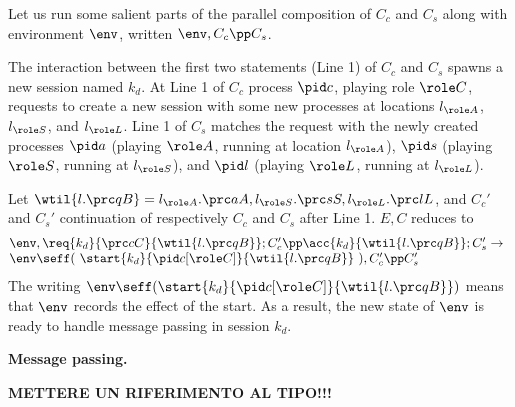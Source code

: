 Let us run some salient parts of the parallel composition of $C_c$ and $C_s$
along with environment $\env$, written $\env,C_c \pp C_s$.

The interaction between the first two statements (Line 1) of $C_c$ and $C_s$
spawns a new session named $k_d$. At Line 1 of $C_c$ process $\pid c$, playing
role $\role C$, requests to create a new session with some new processes at
locations $l_{\role A}$, $l_{\role S}$, and $l_{\role L}$. Line 1 of $C_s$
matches the request with the newly created processes $\pid a$ (playing $\role
A$, running at location $l_{\role A}$), $\pid s$ (playing $\role S$, running at
$l_{\role S}$), and $\pid l$ (playing $\role L$, running at $l_{\role L}$).

Let $\wtil{l.\prc qB} = l_{\role A}.\prc aA,l_{\role S}.\prc sS,l_{\role
L}.\prc lL$, and $C_c'$ and $C_s'$ continuation of respectively $C_c$ and $C_s$
after Line 1. $E,C$ reduces to
$$
\hspace{-.5em}\begin{array}{l}
\env,
\req{k_d}{\prc cC}{\wtil{l.\prc qB}}; C_c' 
	\pp
	\acc{k_d}{\wtil{l.\prc qB}}; C_s'		
\to
\\
\env \seff (\ \start{k_d}{\pid c[\role C]}{\wtil{l.\prc qB}}\ ), C_c' \pp C_s'
\end{array}	
$$
The writing $\env \seff ( \start{k_d}{\pid c[\role C]}{\wtil{l.\prc qB}} )$
means that $\env$ records the effect of the start. As a result, the new state
of $\env$ is ready to handle message passing in session $k_d$.

\textbf{Message passing.}


\textbf{METTERE UN RIFERIMENTO AL TIPO!!!}


